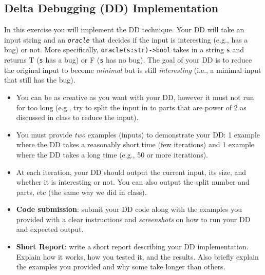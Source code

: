 \documentclass[oneside,11pt,dvipsnames]{book}
\newcommand{\code}[1]{\texttt{#1}}
\begin{document}
\subsection{Delta Debugging (DD) Implementation}\label{exercise:dd-implementation}
In this exercise you will implement the DD technique. Your DD will take an input string and an \emph \code{oracle} that decides if the input is interesting (e.g., has a bug) or not.
More specifically, \code{oracle(s:str)->bool} takes in a string \code{s} and returns T (\code{s} has a bug) or F (\code{s} has no bug).  The goal of your DD is to reduce the original input to become \emph{minimal} but is still \emph{interesting} (i.e., a minimal input that still has the bug).

\begin{itemize}
    \item You can be as creative as you want with your DD, however it must not run for too long (e.g., try to split the input in to parts that are power of 2 as discussed in class to reduce the input).
    \item You must provide \emph{two} examples (inputs) to demonstrate your DD:  1 example where the DD takes a reasonably short time (few iterations) and 1 example where the DD takes a long time (e.g., 50 or more iterations).  
    \item At each iteration, your DD should output the current input, its size, and whether it is interesting or not. You can also output the split number and parts, etc (the same way we did in class).
    \item \textbf{Code submission}: submit your DD code along with the examples you provided with a clear instructions and \emph{screenshots} on how to run your DD and expected output.
    \item \textbf{Short Report}: write a short report describing your DD implementation. Explain how it works, how you tested it, and the results. Also briefly explain the examples you provided and why some take longer than others.
\end{itemize}
\end{document}

